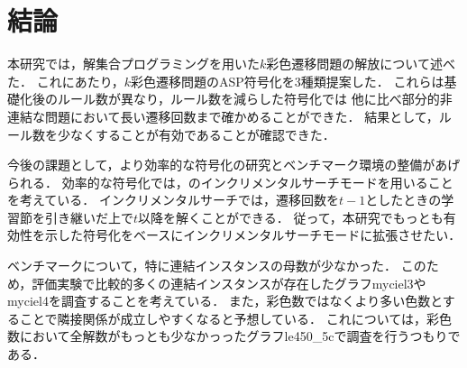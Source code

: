 \chapter{結論} \label{chap:conclusion}
本研究では，解集合プログラミングを用いた$k$彩色遷移問題の解放について述べた．
これにあたり，$k$彩色遷移問題のASP符号化を3種類提案した．
これらは基礎化後のルール数が異なり，ルール数を減らした符号化では
他に比べ部分的非連結な問題において長い遷移回数まで確かめることができた．
結果として，ルール数を少なくすることが有効であることが確認できた．

今後の課題として，より効率的な符号化の研究とベンチマーク環境の整備があげられる．
効率的な符号化では，{\clingo}のインクリメンタルサーチモードを用いることを考えている．
インクリメンタルサーチでは，遷移回数を$t-1$としたときの学習節を引き継いだ上で$t$以降を解くことができる．
従って，本研究でもっとも有効性を示した符号化をベースにインクリメンタルサーチモードに拡張させたい．

ベンチマークについて，特に連結インスタンスの母数が少なかった．
このため，評価実験で比較的多くの連結インスタンスが存在したグラフmyciel3やmyciel4を調査することを考えている．
また，彩色数ではなくより多い色数とすることで隣接関係が成立しやすくなると予想している．
これについては，彩色数において全解数がもっとも少なかっったグラフle450\_5cで調査を行うつもりである．


